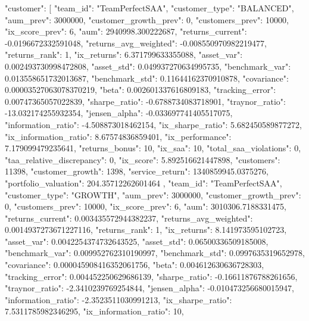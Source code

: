 {
    "customer": [
        {
            "team_id": "TeamPerfectSAA",
            "customer_type": "BALANCED",
            "aum_prev": 3000000,
            "customer_growth_prev": 0,
            "customers_prev": 10000,
            "ix_score_prev": 6,
            "aum": 2940998.300222687,
            "returns_current": -0.0196672332591048,
            "returns_avg_weighted": -0.008550970982219477,
            "returns_rank": 1,
            "ix_returns": 6.371799633355088,
            "asset_var": 0.002493730998472808,
            "asset_std": 0.049937270634995735,
            "benchmark_var": 0.013558651732013687,
            "benchmark_std": 0.11644162370910878,
            "covariance": 0.00003527063078370219,
            "beta": 0.002601337616809183,
            "tracking_error": 0.00747365057022839,
            "sharpe_ratio": -0.6788734083718901,
            "traynor_ratio": -13.032174255932354,
            "jensen_alpha": -0.033697741405517075,
            "information_ratio": -4.508873018462154,
            "ix_sharpe_ratio": 5.682450589877272,
            "ix_information_ratio": 8.67574836859401,
            "ix_performance": 7.179099479235641,
            "returns_bonus": 10,
            "ix_saa": 10,
            "total_saa_violations": 0,
            "taa_relative_discrepancy": 0,
            "ix_score": 5.892516621447898,
            "customers": 11398,
            "customer_growth": 1398,
            "service_return": 1340859945.0375276,
            "portfolio_valuation": 204.35712262601464
        },
        {
            "team_id": "TeamPerfectSAA",
            "customer_type": "GROWTH",
            "aum_prev": 3000000,
            "customer_growth_prev": 0,
            "customers_prev": 10000,
            "ix_score_prev": 6,
            "aum": 3010306.7188331475,
            "returns_current": 0.003435572944382237,
            "returns_avg_weighted": 0.0014937273671227116,
            "returns_rank": 1,
            "ix_returns": 8.141973595102723,
            "asset_var": 0.0042254374732643525,
            "asset_std": 0.06500336509185008,
            "benchmark_var": 0.009952762310190997,
            "benchmark_std": 0.0997635319652978,
            "covariance": 0.000045908416352061756,
            "beta": 0.004612630636728303,
            "tracking_error": 0.004452250629686139,
            "sharpe_ratio": -0.16611876788261656,
            "traynor_ratio": -2.3410239769254844,
            "jensen_alpha": -0.010473256680015947,
            "information_ratio": -2.3523511030991213,
            "ix_sharpe_ratio": 7.5311785982346295,
            "ix_information_ratio": 10,
}}
